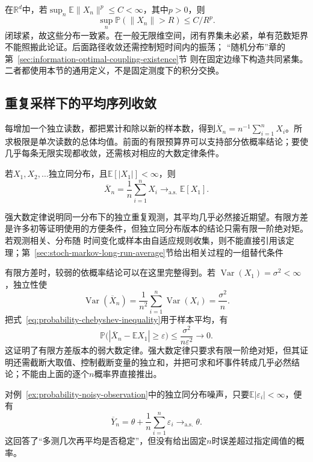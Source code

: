在\(\mathbb R^d\)中，若\(\sup_n\mathbb E\|X_n\|^p\leq C<\infty\)，其中\(p>0\)，则
\[
\sup_n\mathbb P(\|X_n\|>R)\leq C/R^p.
\]
闭球紧，故这些分布一致紧。在一般无限维空间，闭有界集未必紧，单有范数矩界不能照搬此论证。后面路径收敛还需控制短时间内的振荡；
“随机分布”章的第~\ref{sec:information-optimal-coupling-existence}节
则在固定边缘下构造共同紧集。二者都使用本节的通用定义，不是固定测度下的积分交换。

\subsection{重复采样下的平均序列收敛}

每增加一个独立读数，都把累计和除以新的样本数，得到\(\overline X_n=n^{-1}\sum_{i=1}^nX_i\)。所求极限是单次读数的总体均值。前面的有限预算界可以支持部分依概率结论；要使几乎每条无限实现都收敛，还需核对相应的大数定律条件。
\label{sec:rv-aggregate-limits}
\begin{theorem}[强大数定律]
\label{thm:probability-strong-law-large-numbers}
若\(X_1,X_2,\ldots\)独立同分布，且\(\mathbb{E}[|X_1|]<\infty\)，则
\[ \overline{X}_n
  =\frac{1}{n}\sum_{i=1}^{n}X_i\to_{\mathrm{a.s.}}\mathbb{E}[X_1]. \]
\end{theorem}

强大数定律说明同一分布下的独立重复观测，其平均几乎必然接近期望。有限方差是许多初等证明使用的方便条件，但独立同分布版本的结论只需有限一阶绝对矩。若观测相关、分布随
时间变化或样本由自适应规则收集，则不能直接引用该定理；第~\ref{sec:stoch-markov-long-run-average}节给出相关过程的一组替代条件

有限方差时，较弱的依概率结论可以在这里完整得到。若
\(\operatorname{Var}(X_1)=\sigma^2<\infty\)，独立性使
\[
  \operatorname{Var}(\overline{X}_n)
  =\frac{1}{n^2}\sum_{i=1}^{n}\operatorname{Var}(X_i)
  =\frac{\sigma^2}{n}.
\]
把式~\eqref{eq:probability-chebyshev-inequality}用于样本平均，有
\[
  \mathbb{P}\bigl(
    |\overline{X}_n-\mathbb{E}X_1|\geq\varepsilon
  \bigr)
  \leq\frac{\sigma^2}{n\varepsilon^2}\to0.
\]
这证明了有限方差版本的弱大数定律。强大数定律只要求有限一阶绝对矩，但其证明还需截断大取值、控制截断变量的独立和，并把可求和坏事件转成几乎必然结论；不能由上面的逐个\(n\)概率界直接推出。

对例~\ref{ex:probability-noisy-observation}中的独立同分布噪声，只要\(\mathbb{E}|\varepsilon_i|<\infty\)，便有
\[ \overline{Y}_n
  =\theta+\frac{1}{n}\sum_{i=1}^{n}\varepsilon_i\to_{\mathrm{a.s.}}\theta. \]
这回答了“多测几次再平均是否稳定”，但没有给出固定\(n\)时误差超过指定阈值的概率。

